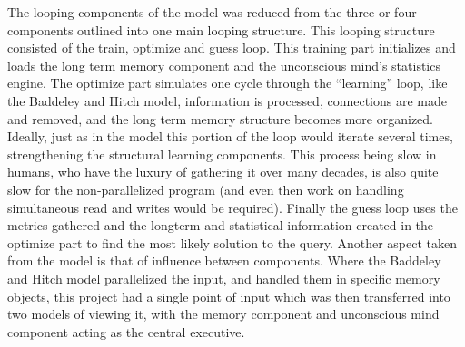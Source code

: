 The looping components of the model was reduced from the three or four
components outlined into one main looping structure.  This looping structure
consisted of the train, optimize and guess loop.  This training part initializes
and loads the long term memory component and the unconscious mind's statistics
engine.  The optimize part simulates one cycle through the ``learning'' loop,
like the Baddeley and Hitch model, information is processed, connections are
made and removed, and the long term memory structure becomes more organized.
Ideally, just as in the model this portion of the loop would iterate several
times, strengthening the structural learning components. This process being slow
in humans, who have the luxury of gathering it over many decades, is also quite
slow for the non-parallelized program (and even then work on handling
simultaneous read and writes would be required). Finally the guess loop uses the
metrics gathered and the longterm and statistical information created in the
optimize part to find the most likely solution to the query. Another aspect
taken from the model is that of influence between components.  Where the
Baddeley and Hitch model parallelized the input, and handled them in specific
memory objects, this project had a single point of input which was then
transferred into two models of viewing it, with the memory component and
unconscious mind component acting as the central executive.

